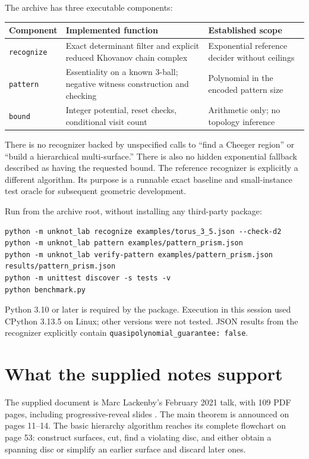 \documentclass[11pt]{article}
\theoremstyle{remark}\newtheorem{remark}[theorem]{Remark}
\newcommand{\code}[1]{\texttt{#1}}
\begin{document}
The archive has three executable components:

\begin{center}
\begin{tabularx}{\textwidth}{@{}>{\raggedright\arraybackslash}p{}>{\raggedright\arraybackslash}X >{\raggedright\arraybackslash}p{}@{}}
\toprule
Component & Implemented function & Established scope\\
\midrule
\code{recognize} & Exact determinant filter and explicit reduced Khovanov
chain complex & Exponential reference decider without ceilings\\
\code{pattern} & Essentiality on a known 3-ball; negative witness construction
and checking & Polynomial in the encoded pattern size\\
\code{bound} & Integer potential, reset checks, conditional visit count &
Arithmetic only; no topology inference\\
\bottomrule
\end{tabularx}
\end{center}

There is no recognizer backed by unspecified calls to ``find a Cheeger region''
or ``build a hierarchical multi-surface.'' There is also no hidden exponential
fallback described as having the requested bound. The reference recognizer is
explicitly a different algorithm. Its purpose is a runnable exact baseline and
small-instance test oracle for subsequent geometric development.

Run from the archive root, without installing any third-party package:
\begin{lstlisting}
python -m unknot_lab recognize examples/torus_3_5.json --check-d2
python -m unknot_lab pattern examples/pattern_prism.json
python -m unknot_lab verify-pattern examples/pattern_prism.json results/pattern_prism.json
python -m unittest discover -s tests -v
python benchmark.py
\end{lstlisting}
Python 3.10 or later is required by the package. Execution in this session used
CPython 3.13.5 on Linux; other versions were not tested. JSON results from the
recognizer explicitly contain \code{quasipolynomial\_guarantee: false}.

\section{What the supplied notes support}

The supplied document is Marc Lackenby's February 2021 talk, with 109 PDF pages,
including progressive-reveal slides \cite{notes}. The main theorem is announced
on pages 11--14. The basic hierarchy algorithm reaches its complete flowchart
on page 53: construct surfaces, cut, find a violating disc, and either obtain a
spanning disc or simplify an earlier surface and discard later ones.
\end{document}
